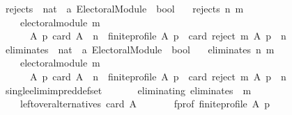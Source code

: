 \begin{isabellebody}
\ rejects\ {\isacharcolon}{\kern0pt}{\isacharcolon}{\kern0pt}\ {\isachardoublequoteopen}nat\ {\isasymRightarrow}\ {\isacharprime}{\kern0pt}a\ Electoral{\isacharunderscore}{\kern0pt}Module\ {\isasymRightarrow}\ bool{\isachardoublequoteclose}\ \isanewline
\ \ {\isachardoublequoteopen}rejects\ n\ m\ {\isasymequiv}\isanewline
\ \ \ \ electoral{\isacharunderscore}{\kern0pt}module\ m\ {\isasymand}\isanewline
\ \ \ \ \ \ {\isacharparenleft}{\kern0pt}{\isasymforall}A\ p{\isachardot}{\kern0pt}\ {\isacharparenleft}{\kern0pt}card\ A\ {\isasymge}\ n\ {\isasymand}\ finite{\isacharunderscore}{\kern0pt}profile\ A\ p{\isacharparenright}{\kern0pt}\ {\isasymlongrightarrow}\ card\ {\isacharparenleft}{\kern0pt}reject\ m\ A\ p{\isacharparenright}{\kern0pt}\ {\isacharequal}{\kern0pt}\ n{\isacharparenright}{\kern0pt}{\isachardoublequoteclose}\isanewline
\isanewline
\isanewline
{}\isamarkupfalse%
\ eliminates\ {\isacharcolon}{\kern0pt}{\isacharcolon}{\kern0pt}\ {\isachardoublequoteopen}nat\ {\isasymRightarrow}\ {\isacharprime}{\kern0pt}a\ Electoral{\isacharunderscore}{\kern0pt}Module\ {\isasymRightarrow}\ bool{\isachardoublequoteclose}\ \isanewline
\ \ {\isachardoublequoteopen}eliminates\ n\ m\ {\isasymequiv}\isanewline
\ \ \ \ electoral{\isacharunderscore}{\kern0pt}module\ m\ {\isasymand}\isanewline
\ \ \ \ \ \ {\isacharparenleft}{\kern0pt}{\isasymforall}A\ p{\isachardot}{\kern0pt}\ {\isacharparenleft}{\kern0pt}card\ A\ {\isachargreater}{\kern0pt}\ n\ {\isasymand}\ finite{\isacharunderscore}{\kern0pt}profile\ A\ p{\isacharparenright}{\kern0pt}\ {\isasymlongrightarrow}\ card\ {\isacharparenleft}{\kern0pt}reject\ m\ A\ p{\isacharparenright}{\kern0pt}\ {\isacharequal}{\kern0pt}\ n{\isacharparenright}{\kern0pt}{\isachardoublequoteclose}\isanewline
\isanewline
{}\isamarkupfalse%
\ single{\isacharunderscore}{\kern0pt}elim{\isacharunderscore}{\kern0pt}imp{\isacharunderscore}{\kern0pt}red{\isacharunderscore}{\kern0pt}def{\isacharunderscore}{\kern0pt}set{\isacharcolon}{\kern0pt}\isanewline
\ \ \isanewline
\ \ \ \ eliminating{\isacharcolon}{\kern0pt}\ {\isachardoublequoteopen}eliminates\ {}\ m{\isachardoublequoteclose}\ \isanewline
\ \ \ \ leftover{\isacharunderscore}{\kern0pt}alternatives{\isacharcolon}{\kern0pt}\ {\isachardoublequoteopen}card\ A\ {\isachargreater}{\kern0pt}\ {}{\isachardoublequoteclose}\ \isanewline
\ \ \ \ f{\isacharunderscore}{\kern0pt}prof{\isacharcolon}{\kern0pt}\ {\isachardoublequoteopen}finite{\isacharunderscore}{\kern0pt}profile\ A\ p{\isachardoublequoteclose}\isanewline

\end{isabellebody}
